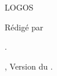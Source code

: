 \vspace*{\fill}%
\begin{center}
  \vspace*{\fill}%
\makebox[\linewidth]{\HRule} %
\parbox[t]{\linewidth}{\addvspace{\parskip} %
\centering\huge\bfseries\thetitle}
 \null%
\vspace*{\parskip}
\makebox[\linewidth]{\HRule}
\vspace*{\fill}
\par LOGOS
\vspace{\fill}
\par \Large Rédigé par \theauthor\par%
\vspace*{\fill}
\large{\theyearname.\par \theuniversity, Version du \thedate.}
\end{center}
